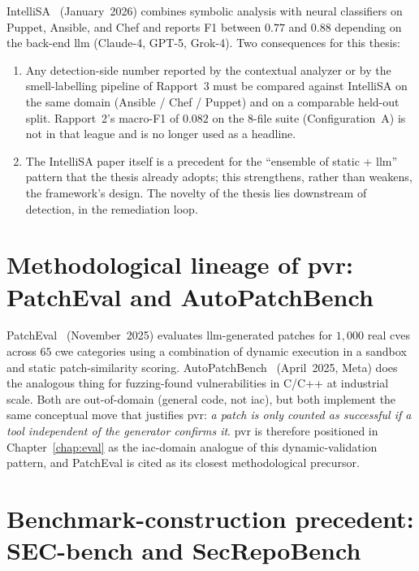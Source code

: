 \documentclass[12pt, a4paper]{report}
\begin{document}
IntelliSA~\citep{intellisa2026} (January~2026) combines symbolic analysis
with neural classifiers on Puppet, Ansible, and Chef and reports F1 between
$0.77$ and $0.88$ depending on the back-end \gls{llm} (Claude-4, GPT-5,
Grok-4). Two consequences for this thesis:

\begin{enumerate}
  \item Any detection-side number reported by the contextual analyzer or by
        the smell-labelling pipeline of Rapport~3 must be compared against
        IntelliSA on the same domain (Ansible / Chef / Puppet) and on a
        comparable held-out split. Rapport~2's macro-F1 of $0.082$ on the
        8-file suite (Configuration~A) is not in that league and is no
        longer used as a headline.
  \item The IntelliSA paper itself is a precedent for the
        ``ensemble of static + \gls{llm}'' pattern that the thesis already
        adopts; this strengthens, rather than weakens, the framework's
        design. The novelty of the thesis lies downstream of detection,
        in the remediation loop.
\end{enumerate}

\section{Methodological lineage of \gls{pvr}: PatchEval and AutoPatchBench}

PatchEval~\citep{lyu2024patcheval} (November~2025) evaluates \gls{llm}-generated
patches for $1{,}000$ real \glspl{cve} across $65$ \gls{cwe} categories using
a combination of dynamic execution in a sandbox and static patch-similarity
scoring. AutoPatchBench~\citep{autopatchbench2025} (April~2025, Meta) does
the analogous thing for fuzzing-found vulnerabilities in C/C++ at industrial
scale. Both are out-of-domain (general code, not \gls{iac}), but both
implement the same conceptual move that justifies \gls{pvr}: \emph{a patch
is only counted as successful if a tool independent of the generator confirms
it}. \gls{pvr} is therefore positioned in Chapter~\ref{chap:eval} as the
\gls{iac}-domain analogue of this dynamic-validation pattern, and PatchEval
is cited as its closest methodological precursor.

\section{Benchmark-construction precedent: SEC-bench and SecRepoBench}
\end{document}
